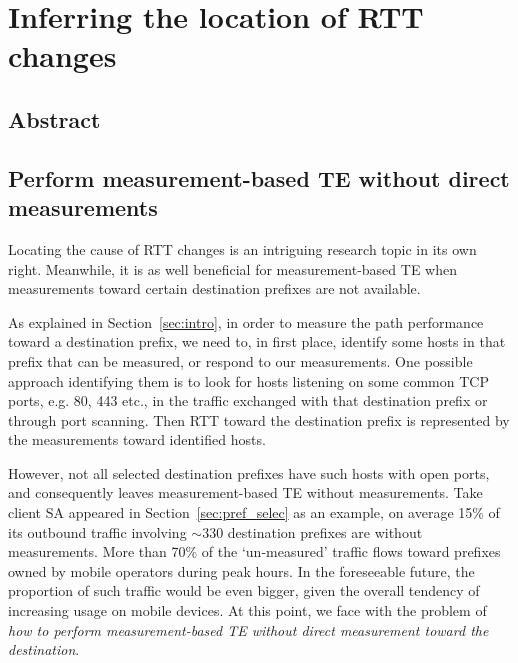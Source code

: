 \chapter{Inferring the location of RTT changes}
\label{sec:infer}
\section*{Abstract}

\section{Perform measurement-based TE without direct measurements}
Locating the cause of RTT changes is an intriguing research topic in its own right.
Meanwhile, it is as well beneficial for measurement-based TE when measurements toward certain destination prefixes are not available.

As explained in Section~\ref{sec:intro}, in order to measure the path performance toward a destination prefix, we need to, in first place, identify some hosts in that prefix that can be measured, or respond to our measurements.
One possible approach identifying them is to look for hosts listening on some common TCP ports, e.g. 80, 443 etc., in the traffic exchanged with that destination prefix or through port scanning.
Then RTT toward the destination prefix is represented by the measurements toward identified hosts.

However, not all selected destination prefixes have such hosts with open ports, and
consequently leaves measurement-based TE without measurements.
Take client SA appeared in Section~\ref{sec:pref_selec} as an example, on average 15\% of its outbound traffic involving $\sim 330$ destination prefixes are without measurements.
More than 70\% of the `un-measured' traffic flows toward prefixes owned by mobile operators during peak hours.
In the foreseeable future, the proportion of such traffic would be even bigger, given the overall tendency of increasing usage on mobile devices.
At this point, we face with the problem of \textit{how to perform measurement-based TE without direct measurement toward the destination}. 

